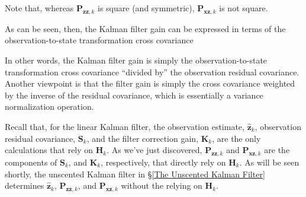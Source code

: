 
Note that, whereas $\mathbf{P}_{\mathbf{zz},k}$ is square (and symmetric),
$\mathbf{P}_{\mathbf{xz},k}$ is not square.

As can be seen, then, the Kalman filter gain can be expressed in terms of the
observation-to-state transformation cross covariance


In other words, the Kalman filter gain is simply the observation-to-state transformation
cross covariance “divided by” the observation residual covariance. Another viewpoint is
that the filter gain is simply the cross covariance weighted by the inverse of the residual
covariance, which is essentially a variance normalization operation.

Recall that, for the linear Kalman filter, the observation estimate, $\hat{\mathbf{z}}_k$,
observation residual covariance, $\mathbf{S}_k$, and the filter correction gain, $\mathbf{K}_k$,
are the only calculations that rely on $\mathbf{H}_k$. As we’ve just discovered,
$\mathbf{P}_{\mathbf{zz},k}$ and $\mathbf{P}_{\mathbf{xz},k}$ are the components of $\mathbf{S}_k$,
and $\mathbf{K}_k$, respectively, that directly rely on $\mathbf{H}_k$. As will be seen shortly,
the unscented Kalman filter in \S\ref{The Unscented Kalman Filter} determines
$\hat{\mathbf{z}}_k$, $\mathbf{P}_{\mathbf{zz},k}$, and $\mathbf{P}_{\mathbf{xz},k}$
without the relying on $\mathbf{H}_k$.
